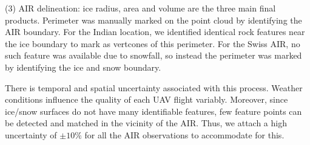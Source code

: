 \documentclass[utf8]{frontiersSCNS}
\begin{document}
\begin{itemize}
(3) AIR delineation: ice radius, area and volume are the three main final products. Perimeter was manually marked
on the point cloud by identifying the AIR boundary. For the Indian location, we identified identical rock features
near the ice boundary to mark as vertcones of this perimeter. For the Swiss AIR, no such feature was available due
to snowfall, so instead the perimeter was marked by identifying the ice and snow boundary.

There is temporal and spatial uncertainty associated with this process. Weather conditions influence the quality
of each UAV flight variably. Moreover, since ice/snow surfaces do not have many identifiable features, few
feature points can be detected and matched in the vicinity of the AIR. Thus, we attach a high uncertainty of
$\pm 10 \%$ for all the AIR observations to accommodate for this.


\end{itemize}
\end{document}
